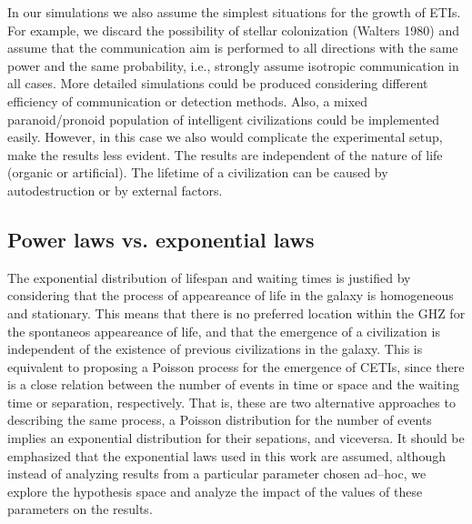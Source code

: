 \documentclass[crop]{CSLB}%
\begin{document}
In our simulations we also assume the simplest situations for the
growth of ETIs.
%
For example, we discard the possibility of stellar colonization
(Walters 1980) and assume that the communication aim is performed to
all directions with the same power and the same probability, i.e.,
strongly assume isotropic communication in all cases.
%
More detailed simulations could be produced considering different 
efficiency of communication or detection methods.
%
Also, a mixed paranoid/pronoid population of intelligent civilizations
could be implemented easily.
%
However, in this case we also would complicate the experimental setup,
make the results less evident.
%
The results are independent of the nature of life (organic or
artificial).
%
The lifetime of a civilization can be caused by autodestruction or by
external factors.








\subsection{Power laws vs. exponential laws}
 


The exponential distribution of lifespan and waiting times is
justified by considering that the process of appeareance of life in
the galaxy is homogeneous and stationary.
%
This means that there is no preferred location within the GHZ for the
spontaneos appeareance of life, and that the emergence of a
civilization is independent of the existence of previous civilizations 
in the galaxy.
%            
This is equivalent to proposing a Poisson process for the emergence of
CETIs, since there is a close relation between the number of events in
time or space and the waiting time or separation, respectively.
%
That is, these are two alternative approaches to describing the same
process, a Poisson distribution for the number of events implies an
exponential distribution for their sepations, and viceversa.
%
It should be emphasized that the exponential laws used in this work
are assumed, although instead of analyzing results from a particular
parameter chosen ad--hoc, we explore the hypothesis space and analyze
the impact of the values of these parameters on the results.
%                                                           
\end{document}
